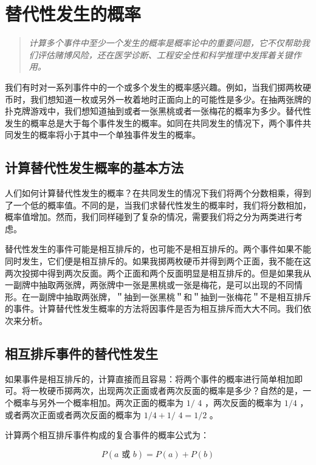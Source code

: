 \section{替代性发生的概率}

\begin{quotation}
\textit{计算多个事件中至少一个发生的概率是概率论中的重要问题，它不仅帮助我们评估赌博风险，还在医学诊断、工程安全性和科学推理中发挥着关键作用。}
\end{quotation}

我们有时对一系列事件中的一个或多个发生的概率感兴趣。例如，当我们掷两枚硬币时，我们想知道一枚或另外一枚着地时正面向上的可能性是多少。在抽两张牌的扑克牌游戏中，我们想知道抽到或者一张黑桃或者一张梅花的概率为多少。替代性发生的概率总是大于每个事件发生的概率。如同在共同发生的情况下，两个事件共同发生的概率将小于其中一个单独事件发生的概率。

\subsection{计算替代性发生概率的基本方法}

人们如何计算替代性发生的概率？在共同发生的情况下我们将两个分数相乘，得到了一个低的概率值。不同的是，当我们求替代性发生的概率时，我们将分数相加，概率值增加。然而，我们同样碰到了复杂的情况，需要我们将之分为两类进行考虑。

替代性发生的事件可能是相互排斥的，也可能不是相互排斥的。两个事件如果不能同时发生，它们便是相互排斥的。如果我掷两枚硬币并得到两个正面，我不能在这两次投掷中得到两次反面。两个正面和两个反面明显是相互排斥的。但是如果我从一副牌中抽取两张牌，两张牌中一张是黑桃或一张是梅花，是可以出现的不同情形。在一副牌中抽取两张牌，＂抽到一张黑桃＂和＂抽到一张梅花＂不是相互排斥的事件。计算替代性发生概率的方法将因事件是否为相互排斥而大大不同。我们依次来分析。

\subsection{相互排斥事件的替代性发生}

如果事件是相互排斥的，计算直接而且容易：将两个事件的概率进行简单相加即可。将一枚硬币掷两次，出现两次正面或者两次反面的概率是多少？自然的是，一个概率与另外一个概率相加。两次正面的概率为 $1 /$ 4 ，两次反面的概率为 $1 / 4$ ，或者两次正面或者两次反面的概率为 $1 / 4+1 /$ $4=1 / 2$ 。

计算两个相互排斥事件构成的复合事件的概率公式为：

$$
P(a \text { 或 } b)=P(a)+P(b)
$$

